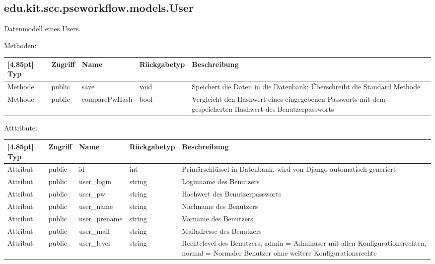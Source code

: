 		\subsection{edu.kit.scc.pseworkflow.models.User}
			Datenmodell eines Users.
			
			Methoden:
			\begin{center}
				\setlength\tabcolsep{5pt}
				\renewcommand{\arraystretch}{1.5}
				
				\begin{tabularx}{\textwidth}{|l|l|l|l|X|}
					\hline
					\rowcolor[gray]{0.75}[4.85pt]
					Typ & Zugriff & Name & Rückgabetyp & Beschreibung \\ \hline 
					Methode & public & save & void & Speichert die Daten in die Datenbank; Überschreibt die Standard Methode \\ \hline
					Methode & public & comparePwHash & bool & Vergleicht den Hashwert eines eingegebenen Passworts mit dem gespeicherten Hashwert des Benutzerpassworts \\
					\hline
				\end{tabularx}
			\end{center}
			
			Atttribute:
			\begin{center}
				\setlength\tabcolsep{5pt}
				\renewcommand{\arraystretch}{1.5}
				
				\begin{tabularx}{\textwidth}{|l|l|l|l|X|}
					\hline
					\rowcolor[gray]{0.75}[4.85pt]
					Typ & Zugriff & Name & Rückgabetyp & Beschreibung \\ \hline 
					Attribut & public & id & int & Primärschlüssel in Datenbank, wird von Django automatisch generiert \\ \hline
					Attribut & public & user\_login & string & Loginname des Benutzers \\
					Attribut & public & user\_pw & string & Hashwert des Benutzerpassworts\\ \hline
					Attribut & public & user\_name & string & Nachname des Benutzers \\ \hline
					Attribut & public & user\_prename & string & Vorname des Benutzers \\ \hline
					Attribut & public & user\_mail & string & Mailadresse des Benutzers \\ \hline
					Attribut & public & user\_level & string & Rechtelevel des Benutzers; admin = Adminuser mit allen Konfigurationsrechten, normal = Normaler Benutzer ohne weitere Konfigurationsrechte \\
					\hline
				\end{tabularx}
			\end{center}
		
